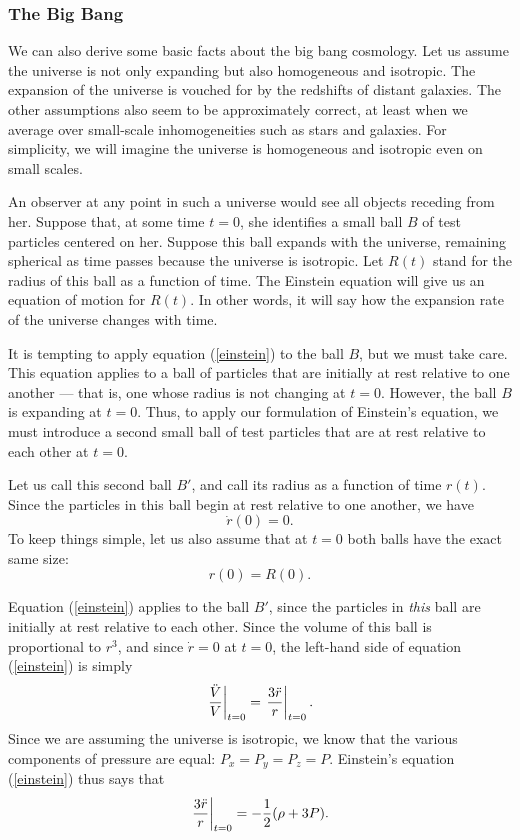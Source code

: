 \subsubsection*{The Big Bang}

We can also derive
some basic facts about the big bang cosmology.  Let us assume the
universe is not only expanding but also homogeneous and isotropic.
The expansion of the universe is vouched for by the redshifts of
distant galaxies.  The other assumptions also seem to be approximately
correct, at least when we average over small-scale inhomogeneities 
such as stars and galaxies.  For simplicity, we will imagine the
universe is homogeneous and isotropic even on small scales.

An observer at any point in such a universe would see all objects
receding from her.  Suppose that, at some time $t=0$, she identifies a
small ball $B$ of test particles centered on her.  Suppose this ball
expands with the universe, remaining spherical as time passes because
the universe is isotropic.  Let $R(t)$ stand for the radius of this ball 
as a function of time.  The Einstein equation will give us an equation of
motion for $R(t)$.  In other words, it will say how the
expansion rate of the universe changes with time.

It is tempting to apply equation (\ref{einstein}) to the ball $B$, but
we must take care.  This equation applies to a ball of
particles that are initially at rest relative to one another --- that
is, one whose radius is not changing at $t=0$.  However, the ball $B$
is expanding at $t=0$.  Thus, to apply our formulation of Einstein's
equation, we must introduce a second small ball of test particles
that are at rest relative to each other at $t = 0$.  

Let us call this second ball $B'$, and call its radius as a function
of time $r(t)$.  Since the particles in this ball begin at rest
relative to one another, we have
\[    \dot r(0) = 0.  \]
To keep things simple, let us also assume that at $t=0$ both balls
have the exact same size:
\[     r(0) = R(0)  .\]

Equation (\ref{einstein}) applies to the ball $B'$, since
the particles in {\it this} ball are initially at rest relative to
each other.  Since the volume of this ball is proportional to $r^3$, 
and since $\dot r = 0$ at $t=0$, the left-hand side of 
equation (\ref{einstein}) is simply
\[
\left.{\ddot V\over V}\right|_{t=0}=\left.{3\ddot r\over r}\right|_{t=0}.
\]
Since we are assuming the universe is isotropic, we know that the 
various components of pressure are equal: 
$P_x = P_y = P_z = P$.  Einstein's equation (\ref{einstein}) thus says 
that 
\[ \left.{3\ddot r\over r}\right|_{t=0} = -{1\over 2}(\rho + 3 P)  .\]

